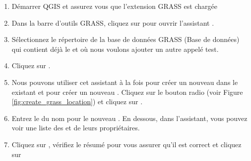 \begin{enumerate}
  \item D\'emarrer QGIS et assurez vous que l'extension GRASS est charg\'ee
  \item Dans la barre d'outils GRASS, cliquez sur  pour ouvrir l'assistant .
  \item S\'electionnez le r\'epertoire  de la base de donn\'ees GRASS (Base de donn\'ees) qui contient d\'ej\`a le  et o\`u nous voulons ajouter un autre  appel\'e test.
  \item Cliquez sur . 
  \item Nous pouvons utiliser cet assistant \`a la fois pour cr\'eer un nouveau  dans le  existant et pour cr\'eer un nouveau . Cliquez sur le bouton radio  (voir Figure \ref{fig:create_grass_location}) et cliquez sur .
  \item Entrez le  du nom pour le nouveau . En dessous, dans l'assistant, vous pouvez voir une liste des  et de leurs propri\'etaires.
  \item Cliquez sur , v\'erifiez le r\'esum\'e pour vous assurer qu'il est correct et cliquez sur  
\end{enumerate}

